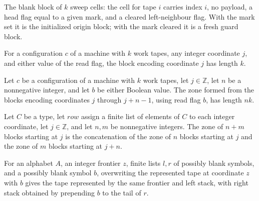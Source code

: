 \begin{definition}
\label{Turing.FinTM.blankRow}
\leanok
{}
The blank block of $k$ sweep cells: the cell for tape $i$ carries index $i$, no payload,
a head flag equal to a given mark, and a cleared left-neighbour flag. With the mark set
it is the initialized origin block; with the mark cleared it is a fresh guard block.
\end{definition}

\begin{lemma}
\label{Turing.FinTM.tapeRow_length}
\leanok
{}
For a configuration $c$ of a machine with $k$ work tapes, any integer coordinate $j$,
and either value of the read flag, the block encoding coordinate $j$ has length $k$.
\end{lemma}

\begin{lemma}
\label{Turing.FinTM.tapeZone_length}
\leanok
{}
Let $c$ be a configuration of a machine with $k$ work tapes, let $j\in\mathbb Z$, let
$n$ be a nonnegative integer, and let $b$ be either Boolean value. The zone formed from
the blocks encoding coordinates $j$ through $j+n-1$, using read flag $b$, has length
$nk$.
\end{lemma}

\begin{lemma}
\label{Turing.FinTM.tapeZone_append}
\leanok
{}
Let $C$ be a type, let $row$ assign a finite list of elements of $C$ to each integer
coordinate, let $j\in\mathbb Z$, and let $n,m$ be nonnegative integers. The zone of
$n+m$ blocks starting at $j$ is the concatenation of the zone of $n$ blocks starting at
$j$ and the zone of $m$ blocks starting at $j+n$.
\end{lemma}

\begin{lemma}
\label{Turing.FinTM.sweepTape_write}
\leanok
{}
For an alphabet $A$, an integer frontier $z$, finite lists $l,r$ of possibly blank
symbols, and a possibly blank symbol $b$, overwriting the represented tape at coordinate
$z$ with $b$ gives the tape represented by the same frontier and left stack, with right
stack obtained by prepending $b$ to the tail of $r$.
\end{lemma}

